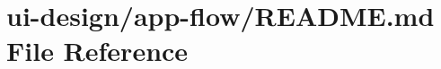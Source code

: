 \hypertarget{app-flow_2README_8md}{}\section{ui-\/design/app-\/flow/\+R\+E\+A\+D\+ME.md File Reference}
\label{app-flow_2README_8md}
